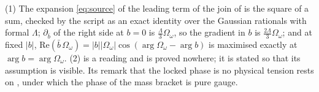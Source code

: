 (1) The expansion \eqref{eq:source} of the leading term of the join of  is the square of a sum, checked by the script as an exact identity over the Gaussian rationals with formal $\Lambda$; $\partial_{\bar b}$ of the right side at $b = 0$ is $\tfrac{\Lambda}{3}\Omega_{\omega}$, so the gradient in $b$ is $\tfrac{2\Lambda}{3}\Omega_{\omega}$; and at fixed $|b|$, $\mathrm{Re}(\bar b\,\Omega_{\omega}) = |b||\Omega_{\omega}|\cos(\arg\Omega_{\omega} - \arg b)$ is maximised exactly at $\arg b = \arg\Omega_{\omega}$. (2) is a reading and is proved nowhere; it is stated so that its assumption is visible. Its remark that the locked phase is no physical tension rests on , under which the phase of the mass bracket is pure gauge.
